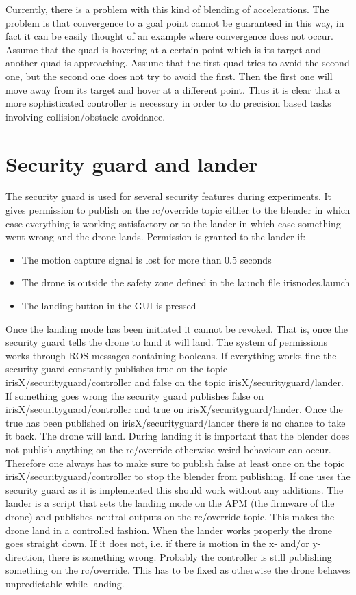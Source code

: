 \documentclass[titlepage,11pt,a4paper]{article}
\begin{document}
Currently, there is a problem with this kind of blending of accelerations. The problem is that convergence to a goal point cannot be guaranteed in this way, in fact it can be easily thought of an example where convergence does not occur. Assume that the quad is hovering at a certain point which is its target and another quad is approaching. Assume that the first quad tries to avoid the second one, but the second one does not try to avoid the first. Then the first one will move away from its target and hover at a different point. Thus it is clear that a more sophisticated controller is necessary in order to do precision based tasks involving collision/obstacle avoidance.

\section{Security guard and lander}
\label{sec:Security guard}

The security guard is used for several security features during experiments. It gives permission to publish on the rc/override topic either to the blender in which case everything is working satisfactory or to the lander in which case something went wrong and the drone lands. Permission is granted to the lander if:
\begin{itemize}
\item The motion capture signal is lost for more than 0.5 seconds 
\item The drone is outside the safety zone defined in the launch file iris\textunderscore nodes.launch
\item The landing button in the GUI is pressed
\end{itemize}
Once the landing mode has been initiated it cannot be revoked. That is, once the security guard tells the drone to land it will land. 
The system of permissions works through ROS messages containing booleans. If everything works fine the security guard constantly publishes true on the topic irisX/security\textunderscore guard/controller and false on the topic irisX/security\textunderscore guard/lander. If something goes wrong the security guard publishes false on irisX/security\textunderscore guard/controller and true on irisX/security\textunderscore guard/lander. Once the true has been published on irisX/security\textunderscore guard/lander there is no chance to take it back. The drone will land. During landing it is important that the blender does not publish anything on the rc/override otherwise weird behaviour can occur. Therefore one always has to make sure to publish false at least once on the topic irisX/security\textunderscore guard/controller to stop the blender from publishing. If one uses the security guard as it is implemented this should work without any additions.
The lander is a script that sets the landing mode on the APM (the firmware of the drone) and publishes neutral outputs on the rc/override topic. This makes the drone land in a controlled fashion. When the lander works properly the drone goes straight down. If it does not, i.e. if there is motion in the x- and/or y-direction, there is something wrong. Probably the controller is still publishing something on the rc/override. This has to be fixed as otherwise the drone behaves unpredictable while landing.
\end{document}
